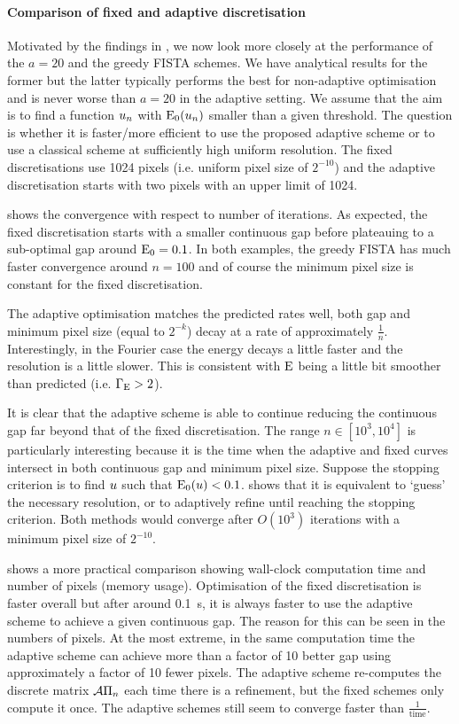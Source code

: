 \documentclass[10pt,a4paper,onecolumn]{article} \usepackage[latin1]{inputenc}
\numberwithin{equation}{section}
\newcommand{\op}[1]{\operatorname{#1}}\newcommand{\overtext}[2]{\stackrel{\text{#1}}{#2}}
\newcommand*{\Func}[1]{%
	\IfEqCase{#1}{%
		{0}{\op{E}}%
		{1}{\op{F}}%
		{2}{\op{G}}%
		{3}{\op{H}}%
	}[\op{F}#1]%
}
\newcommand*{\varf}[1]{%
	\IfEqCase{#1}{%
		{0}{u}%
		{1}{v}%
		{2}{w}%
	}[u#1]%
}
\newcommand*{\vars}[1]{%
	\IfEqCase{#1}{%
		{0}{\alpha}%
		{1}{\beta}%
		{2}{\gamma}%
		{3}{a}%
		{4}{b}%
		{5}{c}%
	}[k#1]%
}
\begin{document}
\paragraph{Comparison of fixed and adaptive discretisation}
Motivated by the findings in , we now look more closely at the performance of the $a=20$ and the greedy FISTA schemes. We have analytical results for the former but the latter typically performs the best for non-adaptive optimisation and is never worse than $a=20$ in the adaptive setting. We assume that the aim is to find a function $\varf0_n$ with $\Func0_0(\varf0_n)$ smaller than a given threshold. The question is whether it is faster/more efficient to use the proposed adaptive scheme or to use a classical scheme at sufficiently high uniform resolution. The fixed discretisations use 1024 pixels (i.e. uniform pixel size of $2^{-10}$) and the adaptive discretisation starts with two pixels with an upper limit of 1024. 

 shows the convergence with respect to number of iterations. As expected, the fixed discretisation starts with a smaller continuous gap before plateauing to a sub-optimal gap around $\Func0_0=0.1$. In both examples, the greedy FISTA has much faster convergence around $n=100$ and of course the minimum pixel size is constant for the fixed discretisation. 

The adaptive optimisation matches the predicted rates well, both gap and minimum pixel size (equal to $2^{-k}$) decay at a rate of approximately $\frac1n$. Interestingly, in the Fourier case the energy decays a little faster and the resolution is a little slower. This is consistent with $\Func0$ being a little bit smoother than predicted (i.e. $\vars2_{\Func0}>2$). 

It is clear that the adaptive scheme is able to continue reducing the continuous gap far beyond that of the fixed discretisation. The range $n\in[10^3,10^4]$ is particularly interesting because it is the time when the adaptive and fixed curves intersect in both continuous gap and minimum pixel size. Suppose the stopping criterion is to find $\varf0$ such that $\Func0_0(\varf0)<0.1$.  shows that it is equivalent to `guess' the necessary resolution, or to adaptively refine until reaching the stopping criterion. Both methods would converge after $O(10^3)$ iterations with a minimum pixel size of $2^{-10}$.

 shows a more practical comparison showing wall-clock computation time and number of pixels (memory usage). Optimisation of the fixed discretisation is faster overall but after around \SI{0.1}{\second}, it is always faster to use the adaptive scheme to achieve a given continuous gap. The reason for this can be seen in the numbers of pixels. At the most extreme, in the same computation time the adaptive scheme can achieve more than a factor of 10 better gap using approximately a factor of 10 fewer pixels. The adaptive scheme re-computes the discrete matrix $\mathcal{A}\Pi_n$ each time there is a refinement, but the fixed schemes only compute it once. The adaptive schemes still seem to converge faster than $\frac1{\op{time}}$.
\end{document}
